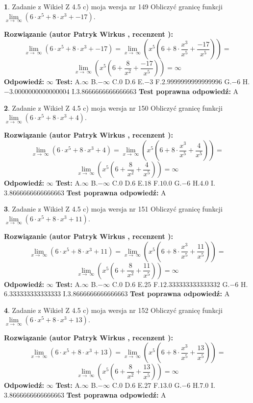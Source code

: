 \documentclass[12pt, a4paper]{article}
\theoremstyle{definition} %
\newtheorem{zad}{}
\newcommand{\zadStart}[1]{\begin{zad}#1\newline}
\newcommand{\zadStop}{\end{zad}}
\newcommand{\rozwStart}[2]{\noindent \textbf{Rozwiązanie (autor #1 , recenzent #2): }\newline}
\newcommand{\rozwStop}{\newline}
\newcommand{\odpStart}{\noindent \textbf{Odpowiedź:}\newline}
\newcommand{\odpStop}{\newline}
\newcommand{\testStart}{\noindent \textbf{Test:}\newline}
\newcommand{\testStop}{\newline}
\newcommand{\kluczStart}{\noindent \textbf{Test poprawna odpowiedź:}\newline}
\newcommand{\kluczStop}{\newline}
\begin{document}
\zadStart{Zadanie z Wikieł Z 4.5 c) moja wersja nr 149}
Obliczyć granicę funkcji  $\lim\limits_{x\to\ \infty}(6 \cdot x^{5}+8 \cdot x^{3}+-17)$.
\zadStop
\rozwStart{Patryk Wirkus}{}
$$\lim\limits_{x\to\ \infty}(6 \cdot x^{5}+8 \cdot x^{3}+-17) = \lim\limits_{x\to\ \infty}(x^{5}(6 +8 \cdot \frac{x^{3}}{x^{5}}+\frac{-17}{x^{5}})) =$$ $$\lim\limits_{x\to\ \infty}(x^{5}(6 +\frac{8}{x^{2}}+\frac{-17}{x^{5}})) =\infty$$
\rozwStop
\odpStart
$\infty$
\odpStop
\testStart
A.$\infty$ B.$-\infty$ C.$0$ D.$6$ E.$-3$
F.$2.9999999999999996$ G.$-6$
H.$-3.0000000000000004$
I.$3.8666666666666663$
\testStop
\kluczStart
A
\kluczStop



\zadStart{Zadanie z Wikieł Z 4.5 c) moja wersja nr 150}
Obliczyć granicę funkcji  $\lim\limits_{x\to\ \infty}(6 \cdot x^{5}+8 \cdot x^{3}+4)$.
\zadStop
\rozwStart{Patryk Wirkus}{}
$$\lim\limits_{x\to\ \infty}(6 \cdot x^{5}+8 \cdot x^{3}+4) = \lim\limits_{x\to\ \infty}(x^{5}(6 +8 \cdot \frac{x^{3}}{x^{5}}+\frac{4}{x^{5}})) =$$ $$\lim\limits_{x\to\ \infty}(x^{5}(6 +\frac{8}{x^{2}}+\frac{4}{x^{5}})) =\infty$$
\rozwStop
\odpStart
$\infty$
\odpStop
\testStart
A.$\infty$ B.$-\infty$ C.$0$ D.$6$ E.$18$
F.$10.0$ G.$-6$
H.$4.0$
I.$3.8666666666666663$
\testStop
\kluczStart
A
\kluczStop



\zadStart{Zadanie z Wikieł Z 4.5 c) moja wersja nr 151}
Obliczyć granicę funkcji  $\lim\limits_{x\to\ \infty}(6 \cdot x^{5}+8 \cdot x^{3}+11)$.
\zadStop
\rozwStart{Patryk Wirkus}{}
$$\lim\limits_{x\to\ \infty}(6 \cdot x^{5}+8 \cdot x^{3}+11) = \lim\limits_{x\to\ \infty}(x^{5}(6 +8 \cdot \frac{x^{3}}{x^{5}}+\frac{11}{x^{5}})) =$$ $$\lim\limits_{x\to\ \infty}(x^{5}(6 +\frac{8}{x^{2}}+\frac{11}{x^{5}})) =\infty$$
\rozwStop
\odpStart
$\infty$
\odpStop
\testStart
A.$\infty$ B.$-\infty$ C.$0$ D.$6$ E.$25$
F.$12.333333333333332$ G.$-6$
H.$6.333333333333333$
I.$3.8666666666666663$
\testStop
\kluczStart
A
\kluczStop



\zadStart{Zadanie z Wikieł Z 4.5 c) moja wersja nr 152}
Obliczyć granicę funkcji  $\lim\limits_{x\to\ \infty}(6 \cdot x^{5}+8 \cdot x^{3}+13)$.
\zadStop
\rozwStart{Patryk Wirkus}{}
$$\lim\limits_{x\to\ \infty}(6 \cdot x^{5}+8 \cdot x^{3}+13) = \lim\limits_{x\to\ \infty}(x^{5}(6 +8 \cdot \frac{x^{3}}{x^{5}}+\frac{13}{x^{5}})) =$$ $$\lim\limits_{x\to\ \infty}(x^{5}(6 +\frac{8}{x^{2}}+\frac{13}{x^{5}})) =\infty$$
\rozwStop
\odpStart
$\infty$
\odpStop
\testStart
A.$\infty$ B.$-\infty$ C.$0$ D.$6$ E.$27$
F.$13.0$ G.$-6$
H.$7.0$
I.$3.8666666666666663$
\testStop
\kluczStart
A
\kluczStop
\end{document}
